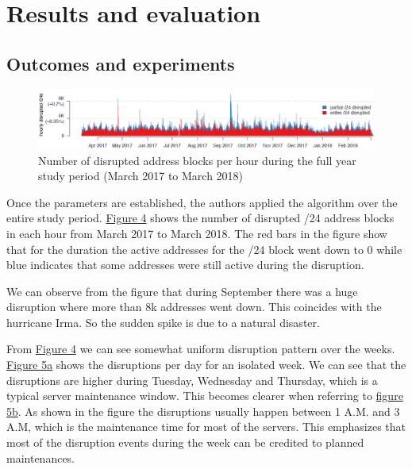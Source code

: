 \documentclass[11pt,twoside,a4paper]{article}
\begin{document}
\section{Results and evaluation} \label{RandEv}
\subsection{Outcomes and experiments}

\begin{figure}[h!] 
\centering
  \includegraphics[width=\linewidth]{4.png}
  \caption{Number of disrupted address blocks per hour during the full year study period (March 2017 to March 2018)}
  \label{fig:Result}
\end{figure}
Once the parameters are established, the authors applied the algorithm over the entire study period. \hyperref[fig:Result]{Figure 4} shows the number of disrupted /24 address blocks in each hour from March 2017 to March 2018. The red bars in the figure show that for the duration the active addresses for the /24 block went down to 0 while blue indicates that some addresses were still active during the disruption.

We can observe from the figure that during September there was a huge disruption where more than 8k addresses went down. This coincides with the hurricane Irma. So the sudden spike is due to a natural disaster.

From \hyperref[fig:Result]{Figure 4} we can see somewhat uniform disruption pattern over the weeks. \hyperref[fig:Patterns]{Figure 5a} shows the disruptions per day for an isolated week. We can see that the disruptions are higher during Tuesday, Wednesday and Thursday, which is a typical server maintenance window. This becomes clearer when referring to \hyperref[fig:Patterns]{figure 5b}. As shown in the figure the disruptions usually happen between 1 A.M. and 3 A.M, which is the maintenance time for most of the servers. This emphasizes that most of the disruption events during the week can be credited to planned maintenances. 
\end{document}
